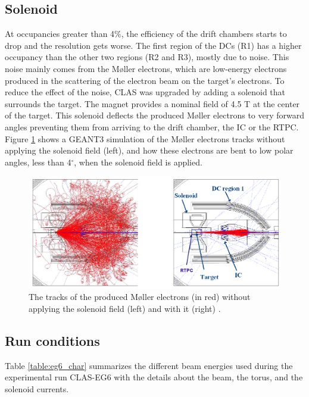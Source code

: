 \subsection{Solenoid}
At occupancies greater than 4$\%$, the efficiency of the drift chambers 
starts to drop and the resolution gets worse. The first region of the DCs (R1) 
has a higher occupancy than the other two regions (R2 and R3), mostly due to 
noise. This noise mainly comes from the M\o ller electrons, which are 
low-energy electrons produced in the scattering of the electron beam on the 
target's electrons. To reduce the effect of the noise, CLAS was upgraded by 
adding a solenoid that surrounds the target. The magnet provides a nominal 
field of 4.5 T at the center of the target. This solenoid deflects the produced 
M\o ller electrons to very forward angles preventing them from arriving to the 
drift chamber, the IC or the RTPC. Figure \ref{fig:solenoid} shows a GEANT3 simulation of the 
M\o ller electrons tracks without applying the solenoid field (left), and how 
these electrons are bent to low polar angles, less than 4$^{\circ}$, when the 
solenoid field is applied.\\

 
\begin{figure}[tp]
\centering
\includegraphics[scale=0.36]{fig/solenoid.png}
\caption{The tracks of the produced M\o ller electrons (in red) without 
applying the solenoid field (left) and with it (right) 
\cite{Hyon-suk}. } \label{fig:solenoid}
\end{figure}

\subsection{Run conditions}

Table \ref{table:eg6_char} summarizes the different beam energies used during 
the experimental run CLAS-EG6 with the details about the beam, the torus, and 
the solenoid currents.  

